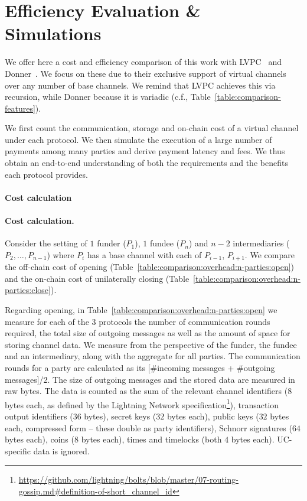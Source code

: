 \section{Efficiency Evaluation \& Simulations}
  \label{section:comparison}
  We offer here a cost and efficiency comparison of this work with
  LVPC~\cite{10.1007/978-3-030-65411-5_18} and Donner~\cite{donner}. We focus on
  these due to their exclusive support of
  virtual channels over any number of base channels. We remind that LVPC
  achieves this via recursion, while Donner
  because it is variadic (c.f., Table~\ref{table:comparison-features}).

  We first count the communication, storage and on-chain cost of a virtual
  channel under each protocol. We then simulate the execution of a large number
  of payments among many parties and derive payment latency and fees. We thus
  obtain an end-to-end understanding of both the requirements and the benefits
  each protocol provides.

  \makeatletter%
    {\paragraph{Cost calculation}}%
    {\paragraph{Cost calculation.}}%
  \makeatother%
  Consider the setting of $1$
  funder ($P_1$), $1$ fundee ($P_n$) and $n-2$ intermediaries ($P_2, \dots,
  P_{n-1}$) where $P_i$ has a base channel with each of $P_{i-1}$,
  $P_{i+1}$. We compare the off-chain cost of opening
  (Table~\ref{table:comparison:overhead:n-parties:open}) and the on-chain cost
  of unilaterally closing
  (Table~\ref{table:comparison:overhead:n-parties:close}).

  Regarding opening, in
  Table~\ref{table:comparison:overhead:n-parties:open} we measure for each of
  the $3$ protocols the number of communication rounds required, the total
  size of outgoing messages as well as the amount of space for storing
  channel data. We measure from the perspective of the funder, the fundee
  and an intermediary, along with the aggregate for all parties. The
  communication rounds for a party are calculated as its [\#incoming messages +
  \#outgoing messages]/2. The size of outgoing messages and the stored data are
  measured in raw bytes. The data is counted as the sum of the relevant channel
  identifiers ($8$ bytes each, as defined by the Lightning Network
  specification\footnote{\url{https://github.com/lightning/bolts/blob/master/07-routing-gossip.md\#definition-of-short_channel_id}}),
  transaction output identifiers ($36$ bytes), secret keys ($32$ bytes each),
  public keys ($32$ bytes each, compressed form -- these double as party
  identifiers), Schnorr signatures ($64$ bytes each), coins ($8$ bytes each),
  times and timelocks (both $4$ bytes each). UC-specific data is ignored.


